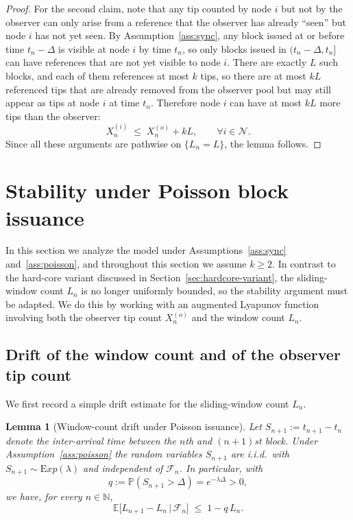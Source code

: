 \documentclass[a4paper,12pt,oneside,reqno]{amsart}
\newcommand{\Nodes}{{\mathcal N}}
\newcommand{\Exp}{{\mathrm Exp}}
\newcommand{\N}{{\mathbb N}}
\renewcommand{\P}{{\mathbb P}}
\newcommand{\E}{{\mathbb E}}
\newcommand{\F}{{\mathcal F}}
\newcommand{\1}{{\mathbf 1}}
\newtheorem{lem}[theo]{Lemma}
\begin{document}
\begin{proof}
	For the second claim, note that any tip counted by node $i$ but not by the observer can only arise from a reference that the observer has already ``seen'' but node $i$ has not yet seen. By Assumption~\ref{ass:sync}, any block issued at or before time $t_n-\Delta$ is visible at node $i$ by time $t_n$, so only blocks issued in $(t_n-\Delta,t_n]$ can have references that are not yet visible to node $i$. There are exactly $L$ such blocks, and each of them references at most $k$ tips, so there are at most $kL$ referenced tips that are already removed from the observer pool but may still appear as tips at node $i$ at time $t_n$. Therefore node $i$ can have at most $kL$ more tips than the observer:
	\[
	   X_n^{(i)} \;\le\; X_n^{(o)} + kL,\qquad \forall i\in\Nodes.
	\]
	Since all these arguments are pathwise on $\{L_n=L\}$, the lemma follows.
	\end{proof}

\section{Stability under Poisson block issuance}\label{sec:poisson}

In this section we analyze the model under Assumptions~\ref{ass:sync} and~\ref{ass:poisson}, and throughout this section we assume $k\ge 2$. In contrast to the hard-core variant discussed in Section~\ref{sec:hardcore-variant}, the sliding-window count $L_n$ is no longer uniformly bounded, so the stability argument must be adapted. We do this by working with an augmented Lyapunov function involving both the observer tip count $X_n^{(o)}$ and the window count $L_n$.

\subsection{Drift of the window count and of the observer tip count}

We first record a simple drift estimate for the sliding-window count $L_n$.

\begin{lem}[Window-count drift under Poisson issuance]\label{lem:poisson-window-drift}
Let $S_{n+1}:=t_{n+1}-t_n$ denote the inter-arrival time between the $n$th and $(n+1)$st block. Under Assumption~\ref{ass:poisson} the random variables $S_{n+1}$ are i.i.d.\ with $S_{n+1}\sim\Exp(\lambda)$ and independent of $\F_n$. In particular, with
\[
   q := \P(S_{n+1}> \Delta) = e^{-\lambda \Delta}>0,
\]
we have, for every $n\in\N$,
\begin{equation}\label{eq:L-drift-poisson}
   \E\bigl[L_{n+1}-L_n \,\big\vert\, \F_n\bigr] \;\le\; 1 - q\,L_n.
\end{equation}
\end{lem}
\end{document}

